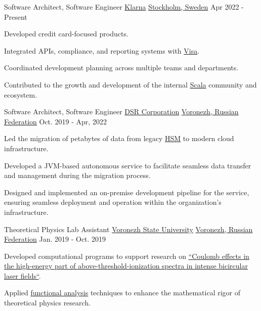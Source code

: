 
\begin{cventries}

	\cventry
	{Software Architect, Software Engineer}
	{\href{https://www.linkedin.com/company/klarna/}{Klarna}}
	{\href{https://www.google.com/maps/place/Stockholm}{Stockholm, Sweden}}
	{Apr 2022 - Present}
	{
		\begin{cvitems}
			\item {Developed credit card-focused products.}
			\item {Integrated APIs, compliance, and reporting systems with  \href{https://www.linkedin.com/company/visa/}{Visa}.}
			\item {Coordinated development planning across multiple teams and departments.}
			\item {Contributed to the growth and development of the internal \href{https://en.wikipedia.org/wiki/Scala_(programming_language)}{Scala} community and ecosystem.}
		\end{cvitems}
	}


	\cventry
	{Software Architect, Software Engineer}
	{\href{https://www.linkedin.com/company/dsr-corporation/}{DSR Corporation}}
	{\href{https://www.google.com/maps/place/Voronezh,+Voronezh+Oblast,+Russia}{Voronezh, Russian Federation}}
	{Oct. 2019 - Apr, 2022}
	{
		\begin{cvitems}
			\item {Led the migration of petabytes of data from legacy \href{https://en.wikipedia.org/wiki/Hierarchical_storage_management}{HSM} to modern cloud infrastructure.}
			\item {Developed a JVM-based autonomous service to facilitate seamless data transfer and management during the migration process.}
			\item {Designed and implemented an on-premise development pipeline for the service, ensuring seamless deployment and operation within the organization's infrastructure.}
		\end{cvitems}
	}

	\cventry
	{Theoretical Physics Lab Assistant}
	{\href{https://www.linkedin.com/school/\%D0\%B2\%D0\%BE\%D1\%80\%D0\%BE\%D0\%BD\%D0\%B5\%D0\%B6\%D1\%81\%D0\%BA\%D0\%B8\%D0\%B9-\%D0\%B3\%D0\%BE\%D1\%81\%D1\%83\%D0\%B4\%D0\%B0\%D1\%80\%D1\%81\%D1\%82\%D0\%B2\%D0\%B5\%D0\%BD\%D0\%BD\%D1\%8B\%D0\%B9-\%D1\%83\%D0\%BD\%D0\%B8\%D0\%B2\%D0\%B5\%D1\%80\%D1\%81\%D0\%B8\%D1\%82\%D0\%B5\%D1\%82}{Voronezh State University}}
	{\href{https://www.google.com/maps/place/Voronezh,+Voronezh+Oblast,+Russia}{Voronezh, Russian Federation}}
	{Jan. 2019 - Oct. 2019}
	{
		\begin{cvitems}
			\item {Developed computational programs to support research on \href{https://journals.aps.org/pra/abstract/10.1103/PhysRevA.106.033117}{``Coulomb effects in the high-energy part of above-threshold-ionization spectra in intense bicircular laser fields``}.}
			\item {Applied \href{https://en.wikipedia.org/wiki/Functional_analysis}{functional analysis} techniques to enhance the mathematical rigor of theoretical physics research.}
		\end{cvitems}
	}

\end{cventries}
